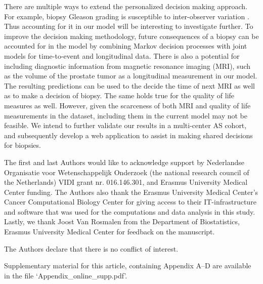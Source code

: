 \documentclass[Afour,sagev,times]{sagej}
\begin{document}
There are multiple ways to extend the personalized decision making approach. For example, biopsy Gleason grading is susceptible to inter-observer variation \cite{coley2017}. Thus accounting for it in our model will be interesting to investigate further. To improve the decision making methodology, future consequences of a biopsy can be accounted for in the model by combining Markov decision processes with joint models for time-to-event and longitudinal data. There is also a potential for including diagnostic information from magnetic resonance imaging (MRI), such as the volume of the prostate tumor as a longitudinal measurement in our model. The resulting predictions can be used to the decide the time of next MRI as well as to make a decision of biopsy. The same holds true for the quality of life measures as well. However, given the scarceness of both MRI and quality of life measurements in the dataset, including them in the current model may not be feasible. We intend to further validate our results in a multi-center AS cohort, and subsequently develop a web application to assist in making shared decisions for biopsies.

\begin{acks}
The first and last Authors would like to acknowledge support by Nederlandse Organisatie voor Wetenschappelijk Onderzoek (the national research council of the Netherlands) VIDI grant nr. 016.146.301, and Erasmus University Medical Center funding. The Authors also thank the Erasmus University Medical Center's Cancer Computational Biology Center for giving access to their IT-infrastructure and software that was used for the computations and data analysis in this study. Lastly, we thank Joost Van Rosmalen from the Department of Biostatistics, Erasmus University Medical Center for feedback on the manuscript.
\end{acks}

\begin{dci}
The Authors declare that there is no conflict of interest.
\end{dci}

\begin{sm}
Supplementary material for this article, containing Appendix A--D are available in the file `Appendix\_online\_supp.pdf'.
\end{sm} 



\end{document}
